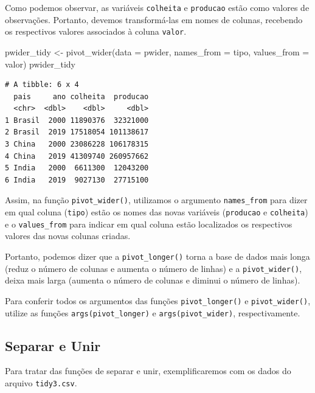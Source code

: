 \documentclass[
  brazilian,
]{book}
\newenvironment{Shaded}{\begin{snugshade}}{\end{snugshade}}
\newcommand{\AttributeTok}[1]{\textcolor[rgb]{0.77,0.63,0.00}{#1}}
\newcommand{\FunctionTok}[1]{\textcolor[rgb]{0.00,0.00,0.00}{#1}}
\newcommand{\NormalTok}[1]{#1}
\newcommand{\OtherTok}[1]{\textcolor[rgb]{0.56,0.35,0.01}{#1}}
\begin{document}
Como podemos observar, as variáveis \texttt{colheita} e \texttt{producao} estão como valores de observações. Portanto, devemos transformá-las em nomes de colunas, recebendo os respectivos valores associados à coluna \texttt{valor}.

\begin{Shaded}
\begin{Highlighting}[]
\NormalTok{pwider\_tidy }\OtherTok{\textless{}{-}} \FunctionTok{pivot\_wider}\NormalTok{(}\AttributeTok{data =}\NormalTok{ pwider,}
                           \AttributeTok{names\_from =}\NormalTok{ tipo,}
                           \AttributeTok{values\_from =}\NormalTok{ valor)}
\NormalTok{pwider\_tidy}
\end{Highlighting}
\end{Shaded}

\begin{verbatim}
# A tibble: 6 x 4
  pais     ano colheita  producao
  <chr>  <dbl>    <dbl>     <dbl>
1 Brasil  2000 11890376  32321000
2 Brasil  2019 17518054 101138617
3 China   2000 23086228 106178315
4 China   2019 41309740 260957662
5 India   2000  6611300  12043200
6 India   2019  9027130  27715100
\end{verbatim}

Assim, na função \texttt{pivot\_wider()}, utilizamos o argumento \texttt{names\_from} para dizer em qual coluna (\texttt{tipo}) estão os nomes das novas variáveis (\texttt{producao} e \texttt{colheita}) e o \texttt{values\_from} para indicar em qual coluna estão localizados os respectivos valores das novas colunas criadas.

Portanto, podemos dizer que a \texttt{pivot\_longer()} torna a base de dados mais longa (reduz o número de colunas e aumenta o número de linhas) e a \texttt{pivot\_wider()}, deixa mais larga (aumenta o número de colunas e diminui o número de linhas).

Para conferir todos os argumentos das funções \texttt{pivot\_longer()} e \texttt{pivot\_wider()}, utilize as funções \texttt{args(pivot\_longer)} e \texttt{args(pivot\_wider)}, respectivamente.

\hypertarget{separar-e-unir}{%
\subsection{Separar e Unir}\label{separar-e-unir}}

Para tratar das funções de separar e unir, exemplificaremos com os dados do arquivo \texttt{tidy3.csv}.
\end{document}
